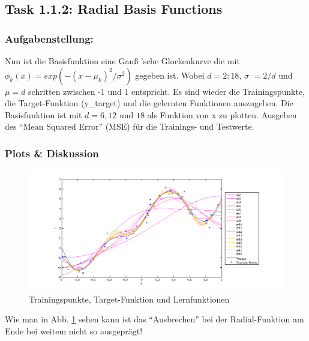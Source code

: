 \subsection{Task 1.1.2: Radial Basis Functions}


\subsubsection{Aufgabenstellung:}
Nun ist die Basisfunktion eine Gau\ss{} 'sche Glockenkurve die mit $\phi_k(x) = exp(-(x-\mu_k)^2 /\sigma^2 )$ gegeben ist.
Wobei $d=2:18$, $\sigma$ $= 2/d$ und $\mu =d$ schritten zwischen -1 und 1 entspricht.
Es sind wieder  die Trainingspunkte, die Target-Funktion (y\_target) und die gelernten Funktionen auszugeben.
Die Basisfunktion ist mit $d=6,12$ und $18$ als Funktion von x zu plotten.
Ausgeben des ``Mean Squared Error'' (MSE) für die Trainings- und Testwerte.



\subsubsection{Plots \& Diskussion}


\begin{figure}[h!]
\begin{center}
 \includegraphics[width=1\textwidth]{./figures/RBF_learn}
 \caption[Trainingspunkte, Target-Funktion und Lernfunktionen]{Trainingspunkte, Target-Funktion und Lernfunktionen}
\label{fig:RBF_learn}
\end{center}
\end{figure}

Wie man in Abb. \ref{fig:RBF_learn} sehen kann ist das ``Ausbrechen'' bei der Radial-Funktion am Ende bei weitem nicht so ausgeprägt!

